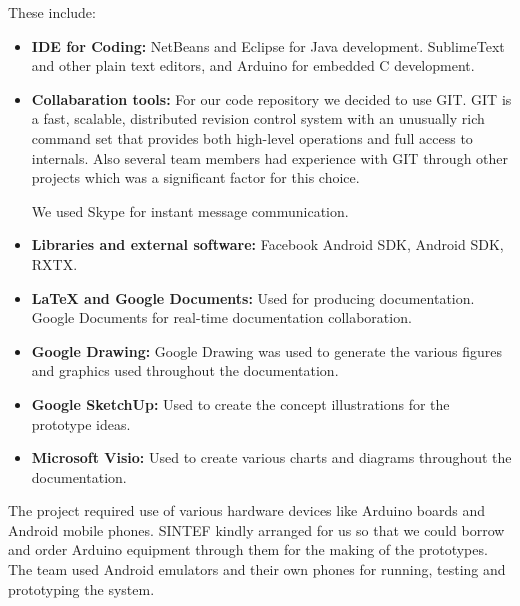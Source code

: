 These include:\newline
\begin{itemize}
	\item \textbf{IDE for Coding:} \newline
	NetBeans\cite{link:netbeans} and Eclipse\cite{link:eclipse} for Java development. SublimeText\cite{link:sublimetext} and other plain text editors, and Arduino\cite{link:arduinodev} for embedded C development.

	\item \textbf{Collabaration tools:} \newline
	For our code repository we decided to use GIT\cite{link:git}. GIT is a fast, scalable, distributed revision control system 
	with an unusually rich command set that provides both high-level operations and full access to internals. Also 
	several team members had experience with GIT through other projects which was a significant factor for 
	this choice.

	We used Skype\cite{link:skype} for instant message communication.

	\item \textbf{Libraries and external software:} \newline
	 Facebook Android SDK\cite{link:facebooksdk}, Android SDK\cite{link:androidsdk}, RXTX\cite{link:rxtx}.

	\item \textbf{\LaTeX{} and Google Documents:} \newline
	Used for producing documentation. Google Documents\cite{link:googledocs} for real-time documentation collaboration.

	\item \textbf{Google Drawing:} \newline
	Google Drawing\cite{link:googledocs} was used to generate the various figures and graphics used throughout the documentation.

	\item \textbf{Google SketchUp:} \newline
	Used to create the concept illustrations for the prototype ideas.\cite{link:googlesketchup}

	\item \textbf{Microsoft Visio:} \newline
	Used to create various charts and diagrams throughout the documentation.\cite{link:visio}

\end{itemize}

The project required use of various hardware devices like Arduino boards and Android mobile phones.
SINTEF kindly arranged for us so that we could borrow and order Arduino equipment through them for the making of the prototypes.
The team used Android emulators and their own phones for running, testing and prototyping the system.

